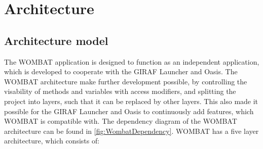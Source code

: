 \section{Architecture}
\label{sec:Architecture}

\subsection{Architecture model}
The WOMBAT application is designed to function as an independent application, which is developed to cooperate with the GIRAF Launcher and Oasis.
The WOMBAT architecture make further development possible, by controlling the visability of methods and variables with access modifiers, and splitting the project into layers, such that it can be replaced by other layers. This also made it possible for the GIRAF Launcher and Oasis to continuously add features, which WOMBAT is compatible with. 
The dependency diagram of the WOMBAT architecture can be found in \autoref{fig:WombatDependency}.
WOMBAT has a five layer architecture, which consists of: 


